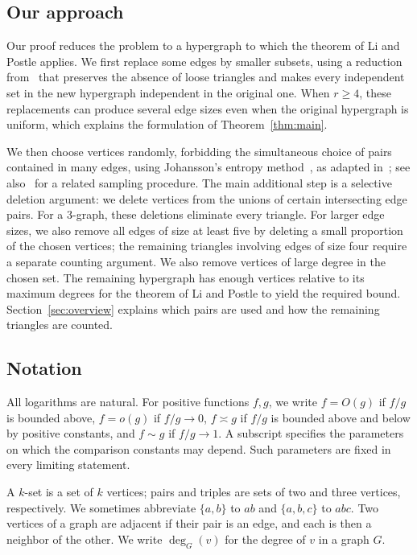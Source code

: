 \documentclass[11pt]{article}
\numberwithin{equation}{section}
\theoremstyle{remark}
\begin{document}
\subsection{Our approach}\label{sec:approach}
Our proof reduces the problem to a hypergraph to which the theorem of Li and Postle applies. We first replace some edges by smaller subsets, using a reduction from~\cite{KMV} that preserves the absence of loose triangles and makes every independent set in the new hypergraph independent in the original one. When $r\ge4$, these replacements can produce several edge sizes even when the original hypergraph is uniform, which explains the formulation of Theorem~\ref{thm:main}.

We then choose vertices randomly, forbidding the simultaneous choice of pairs contained in many edges, using Johansson's entropy method~\cite{Johansson}, as adapted in~\cite{Dhawan}; see also~\cite{MS} for a related sampling procedure. The main additional step is a selective deletion argument: we delete vertices from the unions of certain intersecting edge pairs. For a $3$-graph, these deletions eliminate every triangle. For larger edge sizes, we also remove all edges of size at least five by deleting a small proportion of the chosen vertices; the remaining triangles involving edges of size four require a separate counting argument. We also remove vertices of large degree in the chosen set. The remaining hypergraph has enough vertices relative to its maximum degrees for the theorem of Li and Postle to yield the required bound. Section~\ref{sec:overview} explains which pairs are used and how the remaining triangles are counted.

\subsection{Notation}
All logarithms are natural. For positive functions $f,g$, we write $f=O(g)$ if $f/g$ is bounded above, $f=o(g)$ if $f/g\to0$, $f\asymp g$ if $f/g$ is bounded above and below by positive constants, and $f\sim g$ if $f/g\to1$. A subscript specifies the parameters on which the comparison constants may depend. Such parameters are fixed in every limiting statement.

A $k$-set is a set of $k$ vertices; pairs and triples are sets of two and three vertices, respectively. We sometimes abbreviate $\{a,b\}$ to $ab$ and $\{a,b,c\}$ to $abc$. Two vertices of a graph are adjacent if their pair is an edge, and each is then a neighbor of the other. We write $\deg_G(v)$ for the degree of $v$ in a graph $G$.
\end{document}
